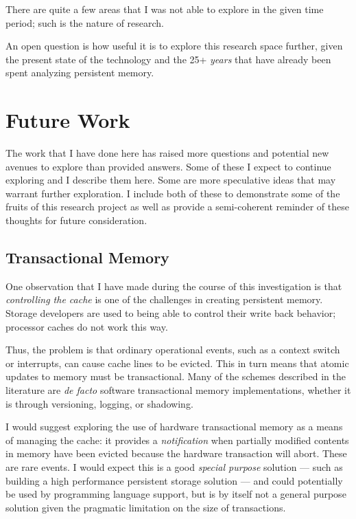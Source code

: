 There are quite a few areas that I was not able to explore in the given time period; such is the nature of research.

An open question is how useful it is to explore this research space further, given the present state of the technology and the 25+ \textit{years} that have already been spent analyzing persistent memory.

\section{Future Work}

The work that I have done here has raised more questions and potential new avenues to explore than provided answers.  Some of these I expect to continue exploring and I describe them here.  Some are more speculative ideas that may warrant further exploration.  I include both of these to demonstrate some of the fruits of this research project as well as provide a semi-coherent reminder of these thoughts for future consideration.

\subsection{Transactional Memory}\label{discussion:trmem}

One observation that I have made during the course of this investigation is that \textit{controlling the cache} is one of the challenges in creating persistent memory. Storage developers are used to being able to control their write back behavior; processor caches do not work this way.

Thus, the problem is that ordinary operational events, such as a context switch or interrupts, can cause cache lines to be evicted.  This in turn means that atomic updates to memory must be transactional.  Many of the schemes described in the literature are \textit{de facto} software transactional memory implementations, whether it is through versioning, logging, or shadowing.

I would suggest exploring the use of hardware transactional memory as a means of managing the cache: it provides a \textit{notification} when partially modified contents in memory have been evicted because the hardware transaction will abort.  These are rare events.  I would expect this is a good \textit{special purpose} solution --- such as building a high performance persistent storage solution --- and could potentially be used by programming language support, but is by itself not a general purpose solution given the pragmatic limitation on the size of transactions.


